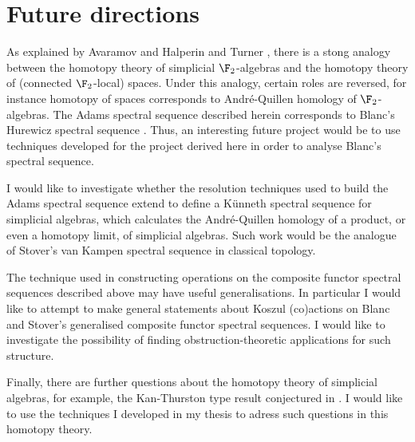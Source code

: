 \documentclass[11pt]{article}
\theoremstyle{plain}
\begin{document}
\section{Future directions}
As explained by Avaramov and Halperin \cite{halperin.pdf} and Turner \cite{TurnerLookingGlass.pdf}, there is a stong analogy between the homotopy theory of simplicial $\F_2$-algebras and the homotopy theory of (connected $\F_2$-local) spaces. Under this analogy, certain roles are reversed, for instance homotopy of spaces corresponds to Andr\'e-Quillen homology of $\F_2$-algebras. The Adams spectral sequence described herein corresponds to Blanc's Hurewicz spectral sequence \cite{BlancHurewiczSS.pdf}. Thus, an interesting future project would be to use techniques developed for the project derived here in order to analyse Blanc's spectral sequence.

I would like to investigate whether the resolution techniques used to build the Adams spectral sequence extend to define a K\"unneth spectral sequence for simplicial algebras, which calculates the Andr\'e-Quillen homology of a product, or even a homotopy limit, of simplicial algebras. Such work would be the analogue of Stover's van Kampen spectral sequence \cite{StoverVanKampen.pdf} in classical topology.

The technique used in constructing operations on the composite functor spectral sequences described above may have useful generalisations. In particular I would like to attempt to make general statements about Koszul (co)actions on Blanc and Stover's generalised composite functor spectral sequences. I would like to investigate the possibility of finding obstruction-theoretic applications for such structure.

Finally, there are further questions about the homotopy theory of simplicial algebras, for example, the Kan-Thurston type result conjectured in \cite{TurnerLookingGlass.pdf}. 
I would like to use the techniques I developed in my thesis to adress such questions in this homotopy theory.

\printbibliography
\end{document}

